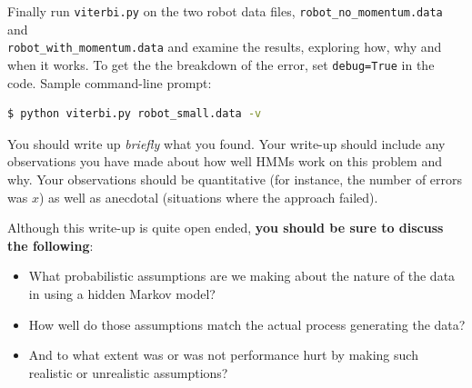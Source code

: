 \documentclass[submit]{harvardml}
\begin{document}
\begin{enumerate}
Finally run {\tt viterbi.py} on the two robot data files, {\tt robot\_no\_momentum.data} and \\{\tt robot\_with\_momentum.data} and examine the results,
  exploring how, why and when it works. To get the the breakdown of the error, set \texttt{debug=True} in the code. Sample command-line prompt: 
  \begin{lstlisting}[language=bash]
  $ python viterbi.py robot_small.data -v
\end{lstlisting}
  You should write up {\em
    briefly} what you found.
  Your write-up should include any observations you  have made
  about how well HMMs work on this problem and why.  Your observations
  should be quantitative (for instance, the number of errors was $x$) as well
  as anecdotal (situations where the approach failed).                                                                                                                                                                     
                                                                                                                                                                                 
  Although this write-up is quite open ended, {\bf you should be sure to                                                                                                           
    discuss the following}:
%
\begin{itemize}
\item  What probabilistic assumptions are we making                                                                                                           
  about the nature of the data in using a hidden Markov model?
\item   How well                                                                                                           
  do those assumptions match the actual process generating the data?                                                              \item                                                 
  And to what extent was or was not performance hurt by making such                                                                                                                
  realistic or unrealistic assumptions?  
\end{itemize}

\end{enumerate}

\end{document}
